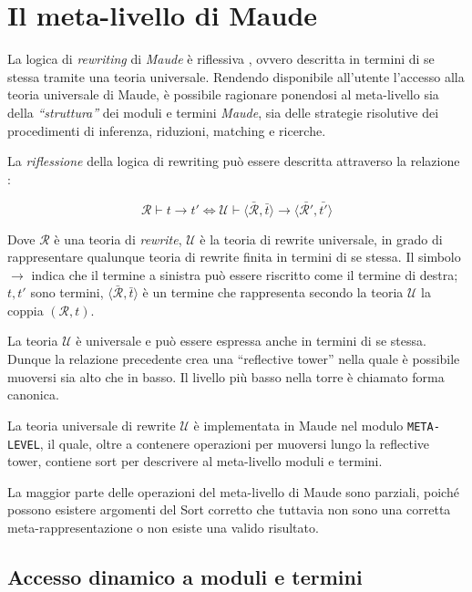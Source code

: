 \section{Il meta-livello di Maude}

La logica di \emph{rewriting} di \emph{Maude} è riflessiva \cite{maudemanual},
ovvero descritta in termini di se stessa tramite una teoria universale. 
Rendendo disponibile all'utente l'accesso alla teoria universale di Maude, è
possibile ragionare ponendosi al meta-livello sia della \emph{``struttura''} dei
moduli e termini \emph{Maude}, sia delle strategie risolutive dei procedimenti
di inferenza, riduzioni, matching e ricerche.

La \emph{riflessione} della logica di rewriting può essere descritta attraverso
la relazione :

\[
	\mathcal{R} \vdash t \to t' \Leftrightarrow \mathcal{U} \vdash \langle
	\bar{\mathcal{R}}, \bar{t} \rangle \to \langle \bar{\mathcal{R}'},	\bar{t'}
	\rangle
\]

Dove $\mathcal{R}$ è una teoria di \emph{rewrite},  $\mathcal{U}$ è la teoria
di rewrite universale, in grado di rappresentare qualunque teoria di rewrite
finita in termini di se stessa. Il simbolo $\to$ indica che il termine a
sinistra può essere riscritto come il termine di destra; $t, t'$ sono termini,
$\langle \bar{\mathcal{R}}, \bar{t} \rangle$ è un termine che rappresenta
secondo la teoria $\mathcal{U}$ la coppia $(\mathcal{R}, t)$.

La teoria $\mathcal{U}$ è universale e può essere espressa anche in termini di
se stessa. Dunque la relazione precedente crea una ``reflective tower'' nella
quale è possibile muoversi sia alto che in basso. Il livello più basso nella
torre è chiamato forma canonica.

La teoria universale di rewrite $\mathcal{U}$ è implementata in
Maude nel modulo \texttt{META-LEVEL}, il quale, oltre a contenere operazioni
per muoversi lungo la reflective tower, contiene sort per descrivere al
meta-livello moduli e termini.

La maggior parte delle operazioni del meta-livello di Maude
sono parziali, poiché possono esistere argomenti del Sort corretto che tuttavia
non sono una corretta meta-rappresentazione o non esiste una valido risultato.

\subsection{Accesso dinamico a moduli e termini}

